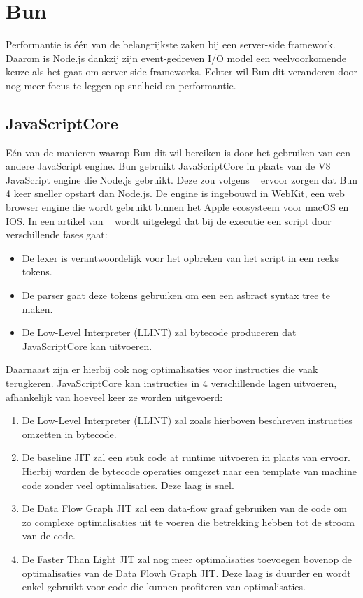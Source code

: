 \section{Bun}
Performantie is één van de belangrijkste zaken bij een server-side framework. 
Daarom is Node.js dankzij zijn event-gedreven I/O model een veelvoorkomende keuze als het gaat om server-side frameworks.
Echter wil Bun dit veranderen door nog meer focus te leggen op snelheid en performantie.


\subsection{JavaScriptCore}
Eén van de manieren waarop Bun dit wil bereiken is door het gebruiken van een andere JavaScript engine.
Bun gebruikt JavaScriptCore in plaats van de V8 JavaScript engine die Node.js gebruikt. 
Deze zou volgens ~\textcite{McDonnel2023} ervoor zorgen dat Bun 4 keer sneller opstart dan Node.js. 
De engine is ingebouwd in WebKit, een web browser engine die wordt gebruikt binnen het Apple ecosysteem voor macOS en IOS.
In een artikel van ~\textcite{Pizlo2020} wordt uitgelegd dat bij de executie een script door verschillende fases gaat:
\begin{itemize}
    \item De lexer is verantwoordelijk voor het opbreken van het script in een reeks tokens.
    \item De parser gaat deze tokens gebruiken om een een asbract syntax tree te maken.
    \item De Low-Level Interpreter (LLINT) zal bytecode produceren dat JavaScriptCore kan uitvoeren.
\end{itemize}
Daarnaast zijn er hierbij ook nog optimalisaties voor instructies die vaak terugkeren. 
JavaScriptCore kan instructies in 4 verschillende lagen uitvoeren, afhankelijk van hoeveel keer ze worden uitgevoerd:
\begin{enumerate}
    \item De Low-Level Interpreter (LLINT) zal zoals hierboven beschreven instructies omzetten in bytecode.
    \item De baseline JIT zal een stuk code at runtime uitvoeren in plaats van ervoor. 
    Hierbij worden de bytecode operaties omgezet naar een template van machine code zonder veel optimalisaties. Deze laag is snel.
    \item De Data Flow Graph JIT zal een data-flow graaf gebruiken van de code om zo complexe optimalisaties uit te voeren die betrekking hebben tot de stroom van de code.
    \item De Faster Than Light JIT zal nog meer optimalisaties toevoegen bovenop de optimalisaties van de Data Flowh Graph JIT. 
    Deze laag is duurder en wordt enkel gebruikt voor code die kunnen profiteren van optimalisaties.
\end{enumerate}
